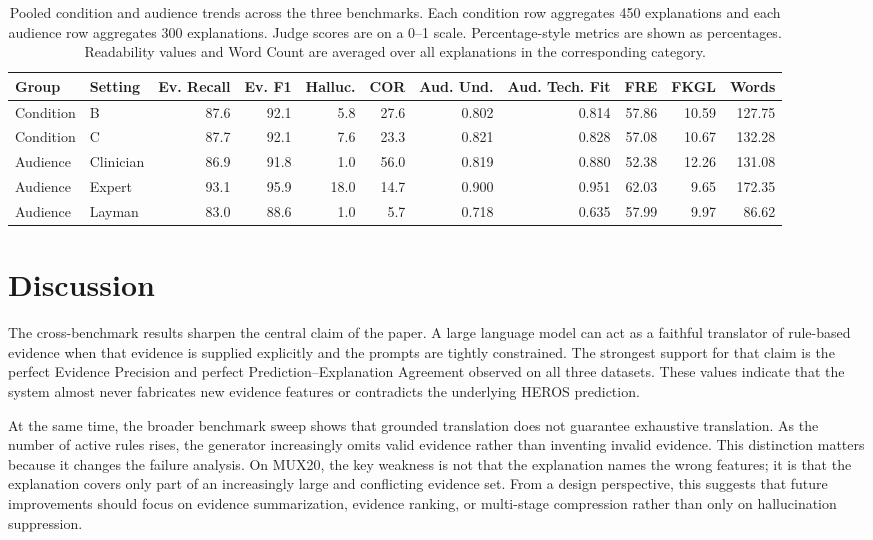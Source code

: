 \documentclass[sigconf,nonacm]{acmart}
\begin{document}
\begin{table}[t]
\caption{Pooled condition and audience trends across the three benchmarks. Each condition row aggregates 450 explanations and each audience row aggregates 300 explanations. Judge scores are on a 0--1 scale. Percentage-style metrics are shown as percentages. Readability values and Word Count are averaged over all explanations in the corresponding category.}
\label{tab:pooled-trends}
\centering
\small
\renewcommand{\arraystretch}{1.08}
\begin{tabular}{llrrrrrrrrr}
\toprule
\textbf{Group} & \textbf{Setting} & \textbf{Ev. Recall} & \textbf{Ev. F1} & \textbf{Halluc.} & \textbf{COR} & \textbf{Aud. Und.} & \textbf{Aud. Tech. Fit} & \textbf{FRE} & \textbf{FKGL} & \textbf{Words} \\
\midrule
Condition & B & 87.6 & 92.1 & 5.8 & 27.6 & 0.802 & 0.814 & 57.86 & 10.59 & 127.75 \\
Condition & C & 87.7 & 92.1 & 7.6 & 23.3 & 0.821 & 0.828 & 57.08 & 10.67 & 132.28 \\
\midrule
Audience & Clinician & 86.9 & 91.8 & 1.0 & 56.0 & 0.819 & 0.880 & 52.38 & 12.26 & 131.08 \\
Audience & Expert & 93.1 & 95.9 & 18.0 & 14.7 & 0.900 & 0.951 & 62.03 & 9.65 & 172.35 \\
Audience & Layman & 83.0 & 88.6 & 1.0 & 5.7 & 0.718 & 0.635 & 57.99 & 9.97 & 86.62 \\
\bottomrule
\end{tabular}
\end{table}

\section{Discussion}
The cross-benchmark results sharpen the central claim of the paper. A large language model can act as a faithful translator of rule-based evidence when that evidence is supplied explicitly and the prompts are tightly constrained. The strongest support for that claim is the perfect Evidence Precision and perfect Prediction--Explanation Agreement observed on all three datasets. These values indicate that the system almost never fabricates new evidence features or contradicts the underlying HEROS prediction.

At the same time, the broader benchmark sweep shows that grounded translation does not guarantee exhaustive translation. As the number of active rules rises, the generator increasingly omits valid evidence rather than inventing invalid evidence. This distinction matters because it changes the failure analysis. On MUX20, the key weakness is not that the explanation names the wrong features; it is that the explanation covers only part of an increasingly large and conflicting evidence set. From a design perspective, this suggests that future improvements should focus on evidence summarization, evidence ranking, or multi-stage compression rather than only on hallucination suppression.
\end{document}
